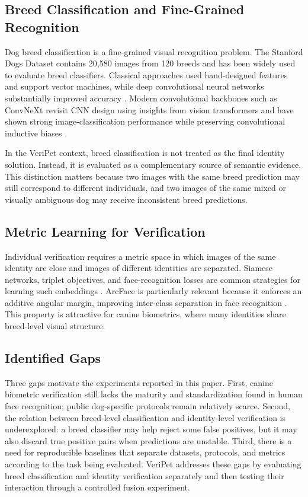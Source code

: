 \documentclass[conference]{IEEEtran}
\begin{document}
\subsection{Breed Classification and Fine-Grained Recognition}

Dog breed classification is a fine-grained visual recognition problem. The Stanford Dogs Dataset \cite{khosla2012stanforddogs} contains 20,580 images from 120 breeds and has been widely used to evaluate breed classifiers. Classical approaches used hand-designed features and support vector machines, while deep convolutional neural networks substantially improved accuracy \cite{parkhi2012dogfaces,sarfraz2015}. Modern convolutional backbones such as ConvNeXt revisit CNN design using insights from vision transformers and have shown strong image-classification performance while preserving convolutional inductive biases \cite{liu2022convnext,dosovitskiy2021vit}.

In the VeriPet context, breed classification is not treated as the final identity solution. Instead, it is evaluated as a complementary source of semantic evidence. This distinction matters because two images with the same breed prediction may still correspond to different individuals, and two images of the same mixed or visually ambiguous dog may receive inconsistent breed predictions.

\subsection{Metric Learning for Verification}

Individual verification requires a metric space in which images of the same identity are close and images of different identities are separated. Siamese networks, triplet objectives, and face-recognition losses are common strategies for learning such embeddings \cite{koch2015siamese,schroff2015facenet}. ArcFace is particularly relevant because it enforces an additive angular margin, improving inter-class separation in face recognition \cite{deng2019arcface}. This property is attractive for canine biometrics, where many identities share breed-level visual structure.

\subsection{Identified Gaps}

Three gaps motivate the experiments reported in this paper. First, canine biometric verification still lacks the maturity and standardization found in human face recognition; public dog-specific protocols remain relatively scarce. Second, the relation between breed-level classification and identity-level verification is underexplored: a breed classifier may help reject some false positives, but it may also discard true positive pairs when predictions are unstable. Third, there is a need for reproducible baselines that separate datasets, protocols, and metrics according to the task being evaluated. VeriPet addresses these gaps by evaluating breed classification and identity verification separately and then testing their interaction through a controlled fusion experiment.
\end{document}
